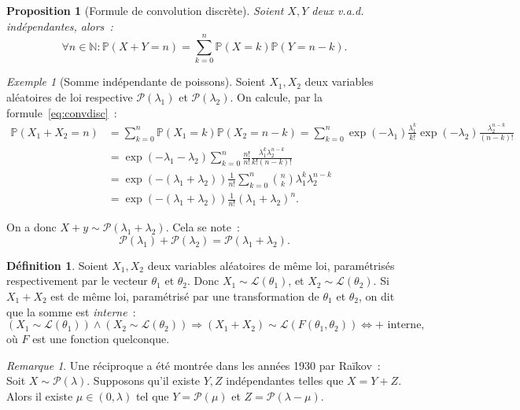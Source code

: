 \documentclass{article}
\newcommand{\N}{\mathbb N}
\renewcommand{\P}{\mathbb P}
\newtheorem{prp}[thm]{Proposition}
\theoremstyle{definition}
\newtheorem{déf}[thm]{Définition}
\theoremstyle{remark}
\newtheorem*{rmq}{Remarque}
\newtheorem{ex}{Exemple}
\begin{document}
		\begin{prp}[Formule de convolution discrète] Soient $X, Y$ deux v.a.d. indépendantes, alors~:
		\begin{equation}\label{eq:convdisc}
			\forall n \in \N : \P(X+Y=n) = \sum_{k=0}^n\P(X=k)\P(Y=n-k).
		\end{equation}
		\end{prp}

		\begin{ex}[Somme indépendante de poissons] Soient $X_1, X_2$ deux variables aléatoires de loi respective $\mathcal P(\lambda_1)$ et $\mathcal P(\lambda_2)$.
		On calcule, par la formule~\eqref{eq:convdisc}~:
		\begin{align*}
			\P(X_1+X_2 = n) &= \sum_{k=0}^n\P(X_1=k)\P(X_2=n-k) = \sum_{k=0}^n\exp(-\lambda_1)\frac {\lambda_1^k}{k!}\exp(-\lambda_2)\frac {\lambda_2^{n-k}}{(n-k)!} \\
			                &= \exp(-\lambda_1-\lambda_2)\sum_{k=0}^n\frac {n!}{n!}\frac {\lambda_1^k\lambda_2^{n-k}}{k!(n-k)!} \\
							&= \exp\left(-(\lambda_1+\lambda_2)\right)\frac 1{n!}\sum_{k=0}^n\binom nk\lambda_1^k\lambda_2^{n-k} \\
							&= \exp\left(-(\lambda_1+\lambda_2)\right)\frac 1{n!}(\lambda_1 + \lambda_2)^n.
		\end{align*}

		On a donc $X+y \sim \mathcal P(\lambda_1 + \lambda_2)$. Cela se note~:
		\[\mathcal P(\lambda_1) + \mathcal P(\lambda_2) = \mathcal P(\lambda_1+\lambda_2).\]
		\end{ex}

		\begin{déf} Soient $X_1, X_2$ deux variables aléatoires de même loi, paramétrisés respectivement par le vecteur $\theta_1$ et $\theta_2$. Donc
		$X_1 \sim \mathcal L(\theta_1)$, et $X_2 \sim \mathcal L(\theta_2)$. Si $X_1 + X_2$ est de même loi, paramétrisé par une transformation de $\theta_1$
		et $\theta_2$, on dit que la somme est \emph{interne}~:
		\[(X_1 \sim \mathcal L(\theta_1)) \land (X_2 \sim \mathcal L(\theta_2)) \Rightarrow (X_1 + X_2) \sim \mathcal L(F(\theta_1, \theta_2)) \iff + \text{ interne},\]
		où $F$ est une fonction quelconque. \end{déf}

		\begin{rmq} Une réciproque a été montrée dans les années 1930 par Raïkov~: Soit $X \sim \mathcal P(\lambda)$. Supposons qu'il existe $Y, Z$ indépendantes
		telles que $X = Y+Z$. Alors il existe $\mu \in (0, \lambda)$ tel que $Y = \mathcal P(\mu)$ et $Z = \mathcal P(\lambda-\mu)$. \end{rmq}
\end{document}
